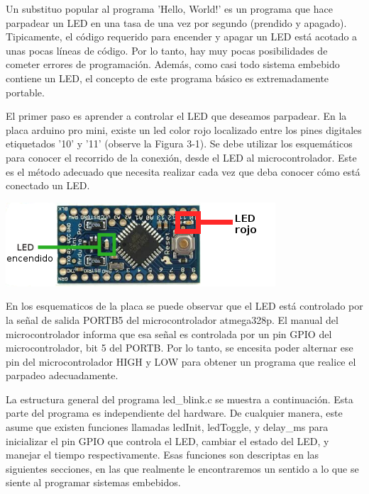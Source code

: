 \documentclass[12pt]{article}
\begin{document}
Un substituo popular al programa 'Hello, World!' es un programa que
hace parpadear un LED en una tasa de una vez por segundo (prendido y apagado).
Tipicamente, el código requerido para encender y apagar un LED está
acotado a unas pocas líneas de código. Por lo tanto, hay muy pocas posibilidades
de cometer errores de programación. Además, como casi todo sistema
embebido contiene un LED, el concepto de este programa básico es extremadamente
portable.


El primer paso es aprender a controlar el LED que deseamos parpadear.
En la placa arduino pro mini, existe un led color rojo localizado entre los
pines digitales etiquetados '10' y '11' 
(observe la Figura 3-1). Se debe utilizar los esquemáticos
para conocer el recorrido de la conexión, desde el LED al microcontrolador.
Este es el método adecuado que necesita realizar cada vez que deba
conocer cómo está conectado un LED.

\begin{center}
\includegraphics{led.png}
\end{center}

En los esquematicos de la placa se puede observar que el LED está controlado por la señal de salida PORTB5 del microcontrolador atmega328p.
El manual del microcontrolador informa que esa señal es controlada por
un pin GPIO del microcontrolador, bit 5 del PORTB. Por lo tanto,
se encesita poder alternar ese pin del microcontrolador HIGH y LOW
para obtener un programa que realice el parpadeo adecuadamente.

La estructura general del programa led\_blink.c se muestra a continuación.
Esta parte del programa es independiente del hardware. De cualquier manera,
este asume que existen funciones llamadas ledInit, ledToggle, y delay\_ms
para inicializar el pin GPIO que controla el LED, cambiar el estado del LED,
y manejar el tiempo respectivamente. Esas funciones son descriptas en las 
siguientes secciones, en las que realmente le encontraremos un
sentido a lo que se siente al programar sistemas embebidos.
\end{document}
